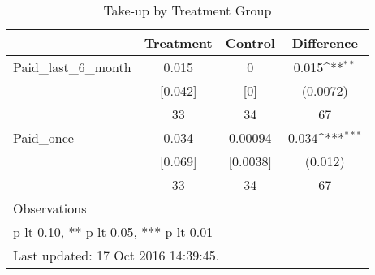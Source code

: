 \begin{table}[htbp]\centering
\def\sym#1{\ifmmode^{#1}\else\(^{#1}\)\fi}
\caption{Take-up by Treatment Group \label{tab:"balance"}}
\begin{tabular*}{0.9\hsize}{@{\hskip\tabcolsep\extracolsep\fill}l*{1}{ccc}}
\toprule
                                &Treatment&  Control&Difference         \\
\midrule
Paid\_last\_6\_month               &    0.015&        0&    0.015\sym{**} \\
                                &  [0.042]&      [0]& (0.0072)         \\
                                &       33&       34&       67         \\
Paid\_once                       &    0.034&  0.00094&    0.034\sym{***}\\
                                &  [0.069]& [0.0038]&  (0.012)         \\
                                &       33&       34&       67         \\
\midrule
Observations                    &         &         &                  \\
\bottomrule
\multicolumn{4}{l}{\footnotesize * p lt 0.10, ** p lt 0.05, *** p lt 0.01}\\
\multicolumn{4}{l}{\footnotesize Last updated: 17 Oct 2016 14:39:45.}\\
\end{tabular*}
\end{table}
